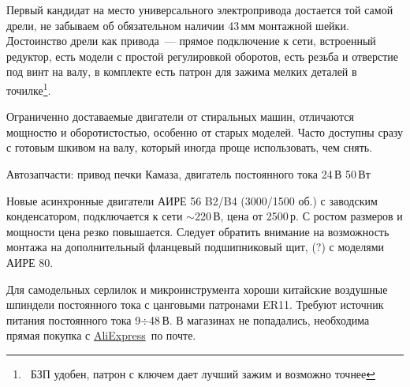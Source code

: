 Первый кандидат на место универсального электропривода достается той самой
дрели, не забываем об обязательном наличии 43\,мм монтажной шейки.
Достоинство дрели как привода\ --- прямое подключение к сети, встроенный
редуктор, есть модели с простой регулировкой оборотов, есть резьба и отверстие
под винт на валу, в комплекте есть патрон для зажима мелких деталей в
точилке\footnote{\ БЗП удобен, патрон с ключем дает лучший зажим и возможно
точнее}.

Ограниченно доставаемые двигатели от стиральных машин, отличаются мощностю и
оборотистостью, особенно от старых моделей. Часто доступны сразу с готовым
шкивом на валу, который иногда проще использовать, чем снять.

Автозапчасти: привод печки Камаза, двигатель постоянного тока 
24\,В 50\,Вт

Новые асинхронные двигатели АИРЕ 56 B2/B4 (3000/1500 об.) с заводским
конденсатором, подключается к сети $\sim$220\,В, цена от 2500\,р.
С ростом размеров и мощности цена резко повышается.
Следует обратить внимание на возможность монтажа на дополнительный фланцевый
подшипниковый щит, (?) с моделями АИРЕ 80.

Для самодельных серлилок и микроинструмента хороши китайские воздушные шпиндели
постоянного тока с цанговыми патронами ER11. Требуют источник питания
постоянного тока 9$\div$48\,В. В магазинах не попадались, необходима прямая
покупка с \href{http://www.aliexpress.com/}{AliExpress}\ по почте.

